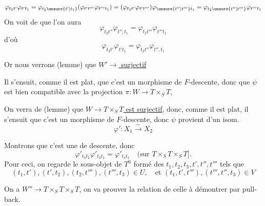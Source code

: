 \[
\varphi_{t_2t'}\varphi_{t't_1}=\varphi_{t_2\unsure{t'|t_1}}(\varphi_{t't'''}\varphi_{t'''t_1})=(\varphi_{t_2t'}\varphi_{t't'''})\varphi_{\unsure{t''|t'''}t_1}=\varphi_{t_2\unsure{t''|t'''}}\varphi_{t'''t_1}
\]
On voit de  que l'on aura
\[
\varphi_{t_2t''}\varphi_{t'',t_1}=\varphi_{t_2t'''}\varphi_{t'''t_1}
\]
d'où 
\[
\varphi_{t_2t'}\varphi_{t't_1}=\varphi_{t_2t''}\varphi_{t'',t_1}
\]

Or nous verrons (lemme) que \uline{$W'\to$   surjectif}

Il s'ensuit, comme il est plat, que c'est un morphisme de $F$-descente, donc que $\psi$ est bien compatible avec la projection $\pi:W\to T\times_S T$,

On verra de  (lemme) que \uline{$W\to T\times_S T$ est surjectif}, donc, comme il est plat, il s'ensuit que c'est un morphisme de $F$-descente, donc $\psi$ provient d'un isom.
\[
\varphi':X_1\xrightarrow{\sim}X_2
\]

Montrons que c'est une   de descente, donc
\[
\varphi'_{t_3t_2}\varphi'_{t_2t_1}=\varphi'_{t_3t_1}\quad (\text{sur }T\times_S T\times_S T].
\]
Pour ceci, on regarde le  sous-objet   de $T^6$ formé des $t_1,t_2,t_3,t',t'',t'''$ tels que
\[
(t_1,t'),(t',t_2),(t_2,t'''),(t''',t_3)\in U,\quad\text{et }(t_1,t',t'''),(t''',t'',t_3)\in V
\]


On a $W''\to T\times_S T\times_S T$, on va prouver la relation  de celle à démontrer par pull-back.
